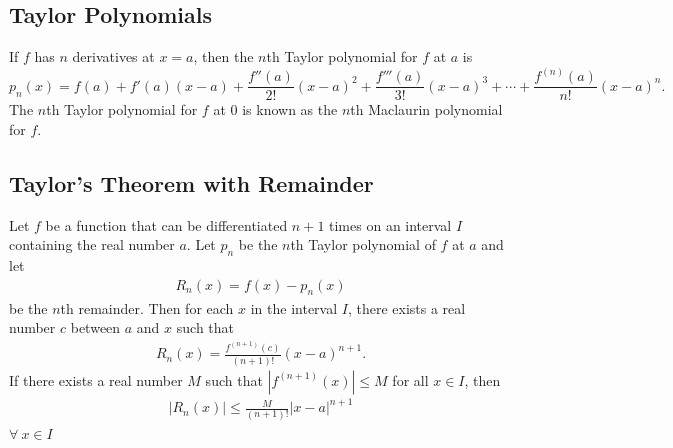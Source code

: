 \documentclass{report}
\begin{document}
    \subsection*{Taylor Polynomials}
    \begin{dfn}
        If $f$ has $n$ derivatives at $x=a$, then the $n$th Taylor polynomial for $f$ at $a$ is
        \begin{equation}
            p_n(x) = f(a) + f'(a)(x-a) + \frac{f''(a)}{2!}(x-a)^2 + \frac{f'''(a)}{3!}(x-a)^3 + \cdots + \frac{f^{(n)}(a)}{n!}(x-a)^n.
        \end{equation}
        The $n$th Taylor polynomial for $f$ at $0$ is known as the $n$th Maclaurin polynomial for $f$.
    \end{dfn}

    \bigbreak \noindent 
    \subsection*{Taylor’s Theorem with Remainder}
    \bigbreak \noindent 
    \begin{thrmm}
       Let $f$ be a function that can be differentiated $n+1$ times on an interval $I$ containing the real number $a$. Let $p_n$ be the $n$th Taylor polynomial of $f$ at $a$ and let
        \begin{align*}
        R_n(x) = f(x) - p_n(x)
        \end{align*}
        be the $n$th remainder. Then for each $x$ in the interval $I$, there exists a real number $c$ between $a$ and $x$ such that
        \begin{align*}
        R_n(x) = \frac{f^{(n+1)}(c)}{(n+1)!}(x - a)^{n+1}.
        \end{align*}
        If there exists a real number $M$ such that $\left|f^{(n+1)}(x)\right| \leq M$ for all $x \in I$, then
        \begin{align*}
        \left|R_n(x)\right| \leq \frac{M}{(n+1)!}\left|x - a\right|^{n+1}
        \end{align*}
       $\forall\ x \in I$ 
    \end{thrmm}
\end{document}
